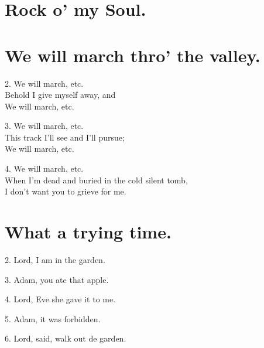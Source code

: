 \documentclass[a5paper,10pt]{book}
\begin{document}
\bigskip
\begin{extra}
\end{extra}


\newpage
\section{Rock o' my Soul.}
\thispagestyle{empty}

\begin{song}
\end{song}


\newpage
\section{We will march thro' the valley.}
\thispagestyle{empty}

\begin{song}
\end{song}

\begin{stanza}
\item[2.]
  We will march, etc.\\
  Behold I give myself away, and\\
  We will march, etc.
\item[3.]
  We will march, etc.\\
  This track I'll see and I'll pursue;\\
  We will march, etc.
\item[4.]
  We will march, etc.\\
  When I'm dead and buried in the cold silent tomb,\\
  I don't want you to grieve for me.
\end{stanza}


\newpage
\section{What a trying time.}
\thispagestyle{empty}

\begin{song}
\end{song}

\begin{stanza}
\item[2.]
  Lord, I am in the garden.
\item[3.]
  Adam, you ate that apple.
\item[4.]
  Lord, Eve she gave it to me.
\item[5.]
  Adam, it was forbidden.
\item[6.]
  Lord, said, walk out de garden.
\end{stanza}
\end{document}
